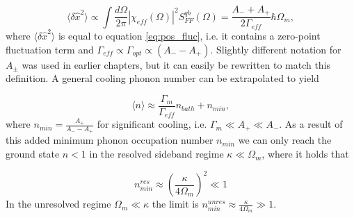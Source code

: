 \begin{equation}
\langle\delta\hat{x}^2\rangle \propto \int\frac{d\Omega}{2\pi} \left| \chi_{eff}(\Omega)\right|^2S_{FF}^{qb}(\Omega) = \frac{A_- + A_+}{2\Gamma_{eff}}\hbar\Omega_m,
\end{equation}
\noindent
where $\langle\delta\hat{x}^2\rangle$ is equal to equation \eqref{eq:pos_fluc}, i.e. it contains a zero-point fluctuation term and $\Gamma_{eff} \propto \Gamma_{opt} \propto (A_- - A_+)$. Slightly different notation for $A_{\pm}$ was used in earlier chapters, but it can easily be rewritten to match this definition. A general cooling phonon number can be extrapolated to yield

\begin{equation}
\langle n\rangle \approx \frac{\Gamma_m}{\Gamma_{eff}}n_{bath} + n_{min},
\label{eq:nf}
\end{equation}
\noindent
where $n_{min} = \frac{A_+}{A_- - A_+}$ for significant cooling, i.e. $\Gamma_m \ll A_+ \ll A_-$. As a result of this added minimum phonon occupation number $n_{min}$ we can only reach the ground state $n < 1$ in the resolved sideband regime $\kappa \ll \Omega_m$, where it holds that

\begin{equation}
n_{min}^{res} \approx \left(\frac{\kappa}{4\Omega_m}\right)^2 \ll 1
\end{equation}
\noindent
In the unresolved regime $\Omega_m \ll \kappa $ the limit is $n_{min}^{unres} \approx \frac{\kappa}{4\Omega_m} \gg 1$.